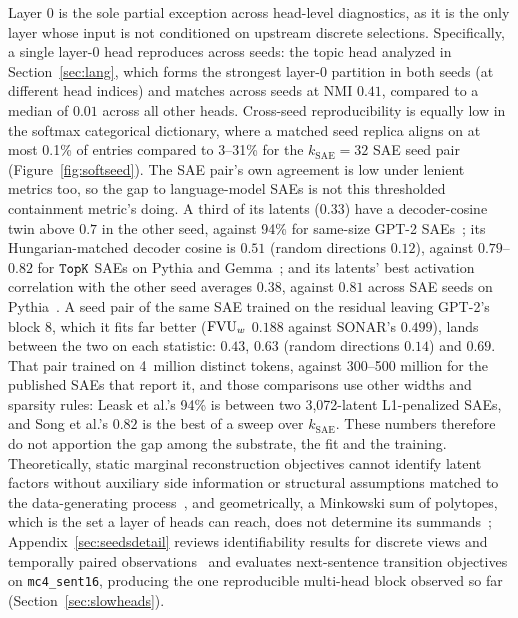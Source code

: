 Layer 0 is the sole partial exception across head-level diagnostics, as it
is the only layer whose input is not conditioned on upstream discrete
selections. Specifically, a single layer-0 head reproduces across seeds: the
topic head analyzed in Section~\ref{sec:lang}, which forms the strongest
layer-0 partition in both seeds (at different head indices) and matches
across seeds at NMI $0.41$, compared to a median of $0.01$ across all other
heads. Cross-seed reproducibility is equally low in the softmax
categorical dictionary, where a matched seed replica aligns on at most
0.1\% of entries compared to 3--31\% for the $k_{\mathrm{SAE}}{=}32$ SAE
seed pair (Figure~\ref{fig:softseed}). The SAE pair's own agreement is
low under lenient metrics too, so the gap to language-model SAEs is not this
thresholded containment metric's doing. A third of its latents (0.33) have
a decoder-cosine twin above $0.7$ in the other seed, against 94\% for
same-size GPT-2 SAEs~\cite{leask2025}; its Hungarian-matched decoder
cosine is $0.51$ (random directions $0.12$), against $0.79$--$0.82$ for
$\mathop{\mathtt{TopK}}\limits$ SAEs on Pythia and Gemma~\cite{song2025positionmechanisticinterpretabilityprioritize};
and its latents' best activation correlation with the other seed averages
$0.38$, against $0.81$ across SAE seeds on Pythia~\cite{wang2024}. A seed
pair of the same SAE trained on the residual leaving GPT-2's block 8, which
it fits far better ($\mathrm{FVU}_w$ $0.188$ against SONAR's $0.499$), lands between
the two on each statistic: $0.43$, $0.63$ (random directions $0.14$) and
$0.69$. That pair trained on 4~million distinct tokens, against 300--500
million for the published SAEs that report it, and those comparisons use
other widths and sparsity rules: Leask et al.'s 94\% is between two
3{,}072-latent L1-penalized SAEs, and Song et al.'s $0.82$ is the best of a
sweep over $k_{\mathrm{SAE}}$. These numbers therefore do not apportion the
gap among the substrate, the fit and the training.
Theoretically, static marginal reconstruction objectives cannot identify
latent factors without auxiliary side information or structural assumptions
matched to the data-generating process~\cite{locatello2019,hillar2015},
and geometrically, a Minkowski sum of polytopes, which is the set a layer
of heads can reach, does not determine its summands~\cite{fel2026rabbit};
Appendix~\ref{sec:seedsdetail} reviews identifiability results for discrete
views and temporally paired observations~\cite{allman2009,udr2020,pcl2017,slowvae2021,locatello2020,ivae2020,zimmermann2021}
and evaluates next-sentence transition objectives on \texttt{mc4\_sent16},
producing the one reproducible multi-head block observed so far
(Section~\ref{sec:slowheads}).

